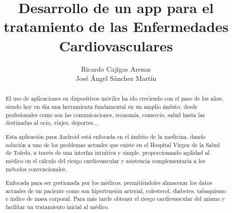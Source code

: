 \documentclass[11pt,spanish,
		listoftables,listoffigures]
		{tfgplantilla}
\title{Desarrollo de un app para el \\
         tratamiento de las Enfermedades Cardiovasculares}
\author{Ricardo Cajigas Arenas \\ José Ángel Sánchez Martín}
\begin{document}



\begin{abstract}
\setcounter{page}{1}
El uso de aplicaciones en dispositivos móviles ha ido creciendo con el paso de los años, siendo hoy en día una herramienta fundamental en un amplio ámbito, desde profesionales como son las comunicaciones, economía, comercio, salud hasta las destinadas al ocio, viajes, deportes...

Esta aplicación para Android está enfocada en el ámbito de la medicina, dando solución a uno de los problemas actuales que existe en el Hospital Virgen de la Salud de Toledo, a través de una interfaz intuitiva y simple, proporcionando agilidad al médico en el cálculo del riesgo cardiovascular y asistencia complementaria a los métodos convencionales.

Enfocada para ser gestionada por los médicos, permitiéndoles almacenar los datos actuales de un paciente como son hipertensión arterial, colesterol, diabetes, tabaquismo e índice de masa corporal. Para más tarde obtener el riesgo cardiovascular del mismo y facilitar un tratamiento inicial al médico.
\end{abstract}
\end{document}
